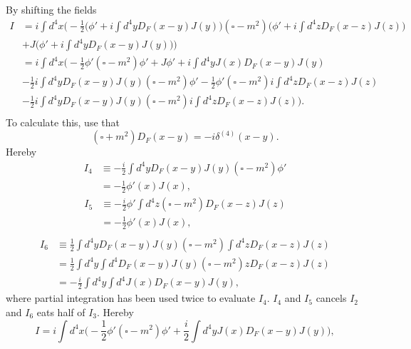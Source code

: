 By shifting the fields
\begin{equation}
	\begin{split}
		I&=i\int d^4x\bigg(-\frac{1}{2}\bigg(\phi'+i\int d^4y D_F(x-y)J(y)\bigg)(\square-m^2)\bigg(\phi'+i\int d^4z D_F(x-z)J(z)\bigg)\\
		&+J\bigg(\phi'+i\int d^4y D_F(x-y)J(y))\bigg)\\
		&=i\int d^4x\bigg(-\frac{1}{2}\phi'(\square-m^2)\phi'+J\phi'+i\int d^4yJ(x) D_F(x-y)J(y)\\
		&-\frac{1}{2}i\int d^4y D_F(x-y)J(y)(\square-m^2)\phi'-\frac{1}{2}\phi'(\square-m^2)i\int d^4z D_F(x-z)J(z)\\
		&-\frac{1}{2}i\int d^4y D_F(x-y)J(y)(\square-m^2)i\int d^4z D_F(x-z)J(z)\bigg).\\
	\end{split}
\end{equation} 
To calculate this, use that
\begin{equation}
	(\square+m^2)D_F(x-y)=-i\delta^{(4)}(x-y).
\end{equation} 
Hereby
\begin{equation}
	\begin{split}
		I_4&\equiv -\frac{i}{2}\int d^4y D_F(x-y)J(y)(\square-m^2)\phi'\\
		&=-\frac{1}{2}\phi'(x)J(x),
	\end{split}
\end{equation} 
\begin{equation}
	\begin{split}
		I_5&\equiv -\frac{i}{2}\phi'\int d^4z (\square-m^2)D_F(x-z)J(z)\\
		&=-\frac{1}{2}\phi'(x)J(x),\\
	\end{split}
\end{equation} 
\begin{equation}
	\begin{split}
		I_6&\equiv \frac{1}{2}\int d^4y D_F(x-y)J(y)(\square-m^2)\int d^4z D_F(x-z)J(z)\\
		&=\frac{1}{2}\int d^4y\int d^4 D_F(x-y)J(y)(\square-m^2)z D_F(x-z)J(z)\\
		&=-\frac{i}{2}\int d^4y\int d^4 J(x)D_F(x-y)J(y),
	\end{split}
\end{equation}  
where partial integration has been used twice to evaluate $I_4$. $I_4$ and $I_5$ cancels $I_2$ and $I_6$ eats half of $I_3$. Hereby
\begin{equation}
		I=i\int d^4x\bigg(-\frac{1}{2}\phi'(\square-m^2)\phi'+\frac{i}{2}\int d^4yJ(x) D_F(x-y)J(y)\bigg),
\end{equation} 	
